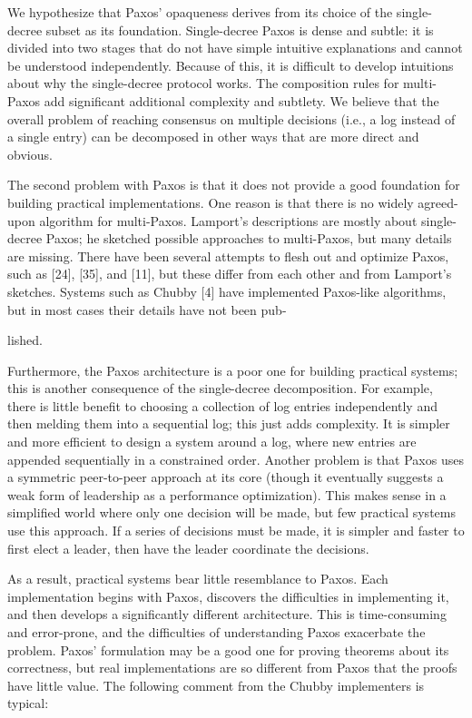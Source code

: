 \documentclass[
]{article}
\begin{document}
We hypothesize that Paxos' opaqueness derives from its choice of the
single-decree subset as its foundation. Single-decree Paxos is dense and
subtle: it is divided into two stages that do not have simple intuitive
explanations and cannot be understood independently. Because of this, it
is difficult to develop intuitions about why the single-decree protocol
works. The composition rules for multi-Paxos add significant additional
complexity and subtlety. We believe that the overall problem of reaching
consensus on multiple decisions (i.e., a log instead of a single entry)
can be decomposed in other ways that are more direct and obvious.

The second problem with Paxos is that it does not provide a good
foundation for building practical implementations. One reason is that
there is no widely agreed-upon algorithm for multi-Paxos. Lamport's
descriptions are mostly about single-decree Paxos; he sketched possible
approaches to multi-Paxos, but many details are missing. There have been
several attempts to flesh out and optimize Paxos, such as {[}24{]},
{[}35{]}, and {[}11{]}, but these differ from each other and from
Lamport's sketches. Systems such as Chubby {[}4{]} have implemented
Paxos-like algorithms, but in most cases their details have not been
pub-

lished.

Furthermore, the Paxos architecture is a poor one for building practical
systems; this is another consequence of the single-decree decomposition.
For example, there is little benefit to choosing a collection of log
entries independently and then melding them into a sequential log; this
just adds complexity. It is simpler and more efficient to design a
system around a log, where new entries are appended sequentially in a
constrained order. Another problem is that Paxos uses a symmetric
peer-to-peer approach at its core (though it eventually suggests a weak
form of leadership as a performance optimization). This makes sense in a
simplified world where only one decision will be made, but few practical
systems use this approach. If a series of decisions must be made, it is
simpler and faster to first elect a leader, then have the leader
coordinate the decisions.

As a result, practical systems bear little resemblance to Paxos. Each
implementation begins with Paxos, discovers the difficulties in
implementing it, and then develops a significantly different
architecture. This is time-consuming and error-prone, and the
difficulties of understanding Paxos exacerbate the problem. Paxos'
formulation may be a good one for proving theorems about its
correctness, but real implementations are so different from Paxos that
the proofs have little value. The following comment from the Chubby
implementers is typical:
\end{document}

